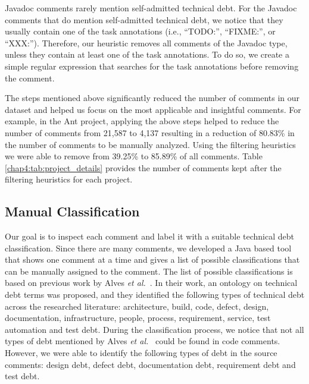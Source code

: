 Javadoc comments rarely mention self-admitted technical debt. For the Javadoc comments that do mention self-admitted technical debt, we notice that they usually contain one of the task annotations (i.e., ``TODO:'', ``FIXME:'', or ``XXX:''). Therefore, our heuristic removes all comments of the Javadoc type, unless they contain at least one of the task annotations.  To do so, we create a simple regular expression that searches for the task annotations before removing the comment.  

The steps mentioned above significantly reduced the number of comments in our dataset and helped us focus on the most applicable and insightful comments. For example, in the Ant project, applying the above steps helped to reduce the number of comments from 21,587 to 4,137 resulting in a reduction of 80.83\% in the number of comments to be manually analyzed. Using the filtering heuristics we were able to remove from 39.25\% to 85.89\% of all comments. Table \ref{chap4:tab:project_details} provides the number of comments kept after the filtering heuristics for each project.

\subsection{Manual Classification}
\label{chap4:sub:manual_classification}

Our goal is to inspect each comment and label it with a suitable technical debt classification. Since there are many comments, we developed a Java based tool that shows one comment at a time and gives a list of possible classifications that can be manually assigned to the comment. The list of possible classifications is based on previous work by Alves \textit{et al.}~\cite{Alves2014MTD}. In their work, an ontology on technical debt terms was proposed, and they identified the following types of technical debt across the researched literature: architecture, build, code, defect, design, documentation, infrastructure, people, process, requirement, service, test automation and test debt. During the classification process, we notice that not all types of debt mentioned by Alves \emph{et al.}~\cite{Alves2014MTD} could be found in code comments. However, we were able to identify the following types of debt in the source comments: design debt, defect debt, documentation debt, requirement debt and test debt. 

